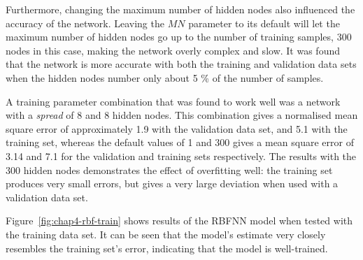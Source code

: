 Furthermore, changing the maximum number of hidden nodes also influenced the accuracy of the network. Leaving the $\mathit{MN}$ parameter to its default will let the maximum number of hidden nodes go up to the number of training samples, 300 nodes in this case, making the network overly complex and slow. It was found that the network is more accurate with both the training and validation data sets when the hidden nodes number only about 5 \% of the number of samples. 

A training parameter combination that was found to work well was a network with a \emph{spread} of 8 and 8 hidden nodes. This combination gives a normalised mean square error of approximately 1.9 with the validation data set, and 5.1 with the training set, whereas the default values of 1 and 300 gives a mean square error of 3.14 and 7.1 for the validation and training sets respectively. The results with the 300 hidden nodes demonstrates the effect of overfitting well: the training set produces very small errors, but gives a very large deviation when used with a validation data set.    

Figure~\ref{fig:chap4-rbf-train} shows results of the RBFNN model when tested with the training data set. It can be seen that the model's estimate very closely resembles the training set's error, indicating that the model is well-trained. 

